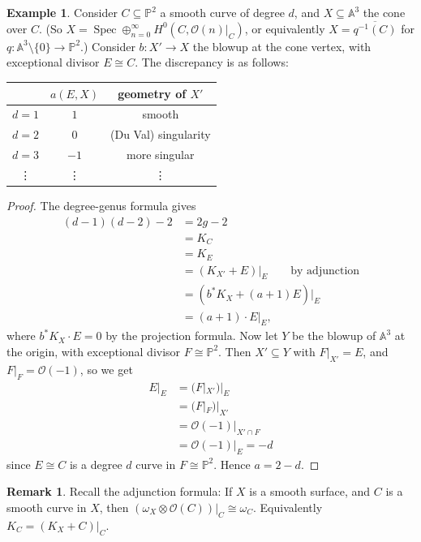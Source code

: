 \documentclass{article}
\theoremstyle{definition}
\newtheorem*{example}{Example}
\newtheorem*{remark}{Remark}
\DeclareMathOperator{\Spec}{Spec}
\renewcommand{\O}{\mathcal{O}}
\newcommand{\A}{\mathbb{A}}
\renewcommand{\P}{\mathbb{P}}
\begin{document}
\begin{example}
    Consider $C\subseteq\P^2$ a smooth curve of degree $d$, and $X\subseteq\A^3$
    the cone over $C$. (So $X=\Spec\oplus_{n=0}^\infty H^0(C,\O(n)|_C)$, or
    equivalently $X=\overline{q^{-1}(C)}$ for $q:\A^3\setminus\{0\}\to\P^2$.)
    Consider $b:X'\to X$ the blowup at the cone vertex, with exceptional divisor
    $E\cong C$. The discrepancy is as follows:
    \begin{center}
        \begin{tabular}{c|c|c}
            & $a(E,X)$ & geometry of $X'$ \\
            \hline
            $d=1$ & $1$ & smooth \\
            $d=2$ & $0$ & (Du Val) singularity \\
            $d=3$ & $-1$ & more singular \\
            \vdots & \vdots & \vdots
        \end{tabular}
    \end{center}
    \begin{proof}
        The degree-genus formula gives
        \begin{align*}
            (d-1)(d-2) - 2
                &= 2g-2 \\
                &= K_C \\
                &= K_E \\
                &= (K_{X'}+E)|_E \qquad \text{by adjunction} \\
                &= (b^*K_X+(a+1)E)|_E \\
                &= (a+1)\cdot E|_E,
        \end{align*}
        where $b^*K_X\cdot E=0$ by the projection formula. Now let $Y$ be the
        blowup of $\A^3$ at the origin, with exceptional divisor $F\cong\P^2$.
        Then $X'\subseteq Y$ with $F|_{X'}=E$, and $F|_F=\O(-1)$, so we get
        \begin{align*}
            E|_E &= (F|_{X'})|_E \\
                 &= (F|_F)|_{X'} \\
                 &= \O(-1)|_{X'\cap F} \\
                 &= \O(-1)|_E = -d
        \end{align*}
        since $E\cong C$ is a degree $d$ curve in $F\cong\P^2$. Hence $a=2-d$.
    \end{proof}
\end{example}

\begin{remark}
    Recall the adjunction formula: If $X$ is a smooth surface, and $C$ is a
    smooth curve in $X$, then $(\omega_X\otimes\O(C))|_C\cong\omega_C$.
    Equivalently $K_C=(K_X+C)|_C$.
\end{remark}
\end{document}
